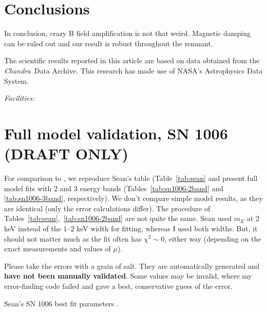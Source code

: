\documentclass[iop, apj, numberedappendix, twocolappendix]{emulateapj}
\newcommand*{\Chandra}{\textit{Chandra}\ }
\begin{document}
\section{Conclusions}

In conclusion, crazy B field amplification is not that weird.
Magnetic damping can be ruled out and our result is robust throughout the remnant.

\acknowledgments

The scientific results reported in this article are based on data obtained from
the \Chandra Data Archive.
This research has made use of NASA's Astrophysics Data System.

{\it Facilities:} 

\clearpage

\appendix

\setcounter{table}{0}
\renewcommand{\thetable}{A\arabic{table}}
\setcounter{figure}{0}
\renewcommand{\thefigure}{A\arabic{figure}}

\section{Full model validation, SN 1006 (DRAFT ONLY)}

For comparison to , we reproduce Sean's table
(Table~\ref{tab:sean} and present full model fits with 2 and 3 energy bands
(Tables~\ref{tab:sn1006-2band} and \ref{tab:sn1006-3band}, respectively).
We don't compare simple model results, as they are identical (only the error
calculations differ).
The procedure of Tables~\ref{tab:sean},~\ref{tab:sn1006-2band} are not quite
the same.  Sean used $m_E$ at 2 keV instead of the $1$--$2$ keV width for
fitting, whereas I used both widths.  But, it should not matter much as
the fit often has $\chi^2 \sim 0$, either way (depending on the exact
measurements and values of $\mu$).

Please take the errors with a grain of salt.  They are automatically
generated and \textbf{have not been manually validated}.  Some values may be
invalid, where my error-finding code failed and gave a best, conservative guess
of the error.

\begin{table}[ht]
    \tiny
    \centering
    \caption{Sean's SN 1006 best fit parameters .
    \label{tab:sean}}
    
\end{table}
\end{document}
